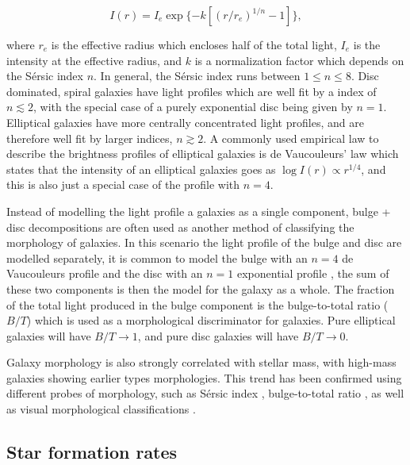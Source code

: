 \begin{equation}
  I(r) = I_e \exp \{-k [(r/r_e)^{1/n} - 1]\},
\end{equation}

\noindent
where $r_e$ is the effective radius which encloses half of the total
light, $I_e$ is the intensity at the effective radius, and $k$ is a
normalization factor which depends on the S{\'e}rsic index $n$.  In
general, the S{\'e}rsic index runs between $1 \le n \le 8$.  Disc
dominated, spiral galaxies have light profiles which are well fit by a
\ser index of $n \lesssim 2$, with the special case of a purely
exponential disc being given by $n=1$.  Elliptical galaxies have more
centrally concentrated light profiles, and are therefore well fit by
larger \ser indices, $n \gtrsim 2$.  A commonly used empirical law to
describe the brightness profiles of elliptical galaxies is de
Vaucouleurs' law which states that the intensity of an elliptical
galaxies goes as $\log I(r) \propto r^{1/4}$, and this is also just a
special case of the \ser profile with $n=4$.
\par
Instead of modelling the light profile a galaxies as a single
component, bulge + disc decompositions are often used as another
method of classifying the morphology of galaxies.  In this scenario
the light profile of the bulge and disc are modelled separately, it is
common to model the bulge with an $n=4$ de Vaucouleurs profile and the
disc with an $n=1$ exponential profile \citep[e.g.][]{simard2002}, the
sum of these two
components is then the model for the galaxy as a whole.  The fraction
of the total light produced in the bulge component is the bulge-to-total ratio
($B/T$) which is used as a morphological discriminator for galaxies.
Pure elliptical galaxies will have $B/T \to 1$, and pure disc galaxies
will have $B/T \to 0$.
\par
Galaxy morphology is also strongly correlated with stellar mass, with
high-mass galaxies showing earlier types morphologies.  This trend has
been confirmed using different probes of morphology, such as
S{\'e}rsic index \citep{vanderwel2008}, bulge-to-total ratio
\citep{bluck2014}, as well as visual morphological classifications
\citep{bamford2009}.   

\subsection{Star formation rates}
\label{sec:sfr}

